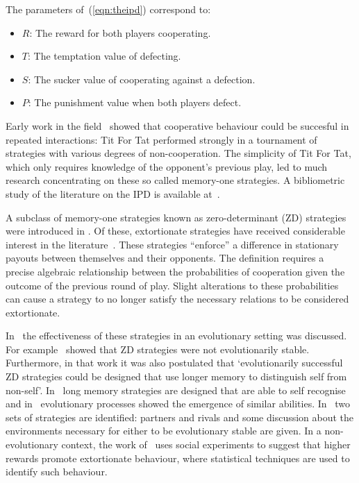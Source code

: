 \documentclass[a4paper]{article}
\begin{document}
The parameters of~(\ref{eqn:theipd}) correspond to:

\begin{itemize}
    \item \(R\): The reward for both players cooperating.
    \item \(T\): The temptation value of defecting.
    \item \(S\): The sucker value of cooperating against a defection.
    \item \(P\): The punishment value when both players defect.
\end{itemize}

Early work in the field~\cite{Axelrod1980, Axelrod1980a} showed that cooperative behaviour
could be succesful in repeated interactions: Tit For Tat performed
strongly in a tournament of strategies with various degrees of non-cooperation.
The simplicity of Tit For Tat, which only requires knowledge of the
opponent's previous play, led to much research concentrating on these so called
memory-one strategies. A bibliometric study of the literature on the IPD is available
at~\cite{glynatsi2021bibliometric}.

A subclass of memory-one strategies known as zero-determinant (ZD) strategies
were introduced in \cite{Press2012}. Of these, extortionate strategies have received
considerable interest in the literature~\cite{hilbe2015partners}. These
strategies ``enforce'' a difference in stationary payouts between themselves and
their opponents. The definition requires a precise algebraic relationship
between the probabilities of cooperation given the outcome of the previous round
of play. Slight alterations to these probabilities can cause a strategy to no
longer satisfy the necessary relations to be considered extortionate.

In~\cite{adami2013evolutionary, hilbe2018partners, Hilbe2013, hilbe2013adaptive,
hilbe2015partners, ichinose2018zero, Moran1707} the effectiveness of these
strategies in an evolutionary setting was discussed. For
example~\cite{adami2013evolutionary} showed that ZD strategies were not
evolutionarily stable. Furthermore, in that work it was also postulated that
`evolutionarily successful ZD strategies could be designed that use longer
memory to distinguish self from non-self'. In~\cite{lee2015art} long memory
strategies are designed that are able to self recognise and in~\cite{Moran1707}
evolutionary processes showed the emergence of similar abilities.
In~\cite{hilbe2018partners} two sets of strategies are identified: partners and
rivals and some discussion about the environments necessary for either to be
evolutionary stable are given. In a non-evolutionary context, the work of~\cite{becks2019extortion} uses social
experiments to suggest that higher rewards promote extortionate
behaviour, where statistical techniques are used to identify such behaviour.
\end{document}
